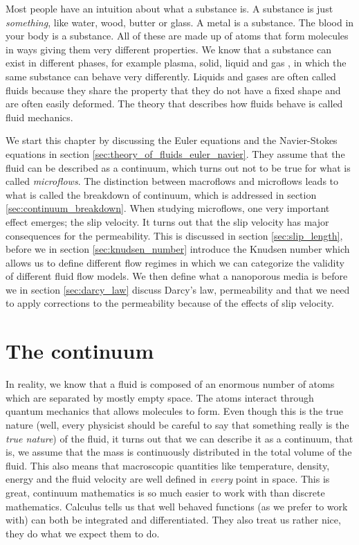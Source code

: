 Most people have an intuition about what a substance is. A substance is just \textit{something}, like water, wood, butter or glass. A metal is a substance. The blood in your body is a substance. All of these are made up of atoms that form molecules in ways giving them very different properties. We know that a substance can exist in different phases, for example plasma, solid, liquid and gas \cite{ravndal2008statmech}, in which the same substance can behave very differently. Liquids and gases are often called fluids because they share the property that they do not have a fixed shape and are often easily deformed. The theory that describes how fluids behave is called fluid mechanics.

We start this chapter by discussing the Euler equations and the Navier-Stokes equations in section \ref{sec:theory_of_fluids_euler_navier}. They assume that the fluid can be described as a continuum, which turns out not to be true for what is called \textit{microflows}. The distinction between macroflows and microflows leads to what is called the breakdown of continuum, which is addressed in section \ref{sec:continuum_breakdown}. When studying microflows, one very important effect emerges; the slip velocity. It turns out that the slip velocity has major consequences for the permeability. This is discussed in section \ref{sec:slip_length}, before we in section \ref{sec:knudsen_number} introduce the Knudsen number which allows us to define different flow regimes in which we can categorize the validity of different fluid flow models. We then define what a nanoporous media is before we in section \ref{sec:darcy_law} discuss Darcy's law, permeability and that we need to apply corrections to the permeability because of the effects of slip velocity.

\section{The continuum}
\label{sec:continuum}
In reality, we know that a fluid is composed of an enormous number of atoms which are separated by mostly empty space. The atoms interact through quantum mechanics that allows molecules to form. Even though this is the true nature (well, every physicist should be careful to say that something really is the \textit{true nature}) of the fluid, it turns out that we can describe it as a continuum, that is, we assume that the mass is continuously distributed in the total volume of the fluid. This also means that macroscopic quantities like temperature, density, energy and the fluid velocity are well defined in \textit{every} point in space. This is great, continuum mathematics is so much easier to work with than discrete mathematics. Calculus tells us that well behaved functions (as we prefer to work with) can both be integrated and differentiated. They also treat us rather nice, they do what we expect them to do.


